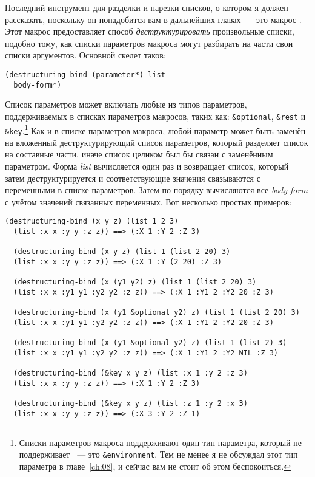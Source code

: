 Последний инструмент для разделки и нарезки списков, о котором я должен рассказать,
поскольку он понадобится вам в дальнейших главах~--- это макрос
. Этот макрос предоставляет способ \textit{деструктурировать}
произвольные списки, подобно тому, как списки параметров макроса могут разбирать на части
свои списки аргументов. Основной скелет  таков:

\begin{lstlisting}
(destructuring-bind (parameter*) list
  body-form*)
\end{lstlisting}

Список параметров может включать любые из типов параметров, поддерживаемых в списках
параметров макросов, таких как: \lstinline!&optional!, \lstinline!&rest! и
\lstinline!&key!.\footnote{Списки параметров макроса поддерживают один тип параметра,
  который не поддерживает ~--- это \lstinline!&environment!. Тем не
  менее я не обсуждал этот тип параметра в главе~\ref{ch:08}, и сейчас вам не стоит об
  этом беспокоиться.} Как и в списке параметров макроса, любой параметр может быть заменён
на вложенный деструктурирующий список параметров, который разделяет список на составные
части, иначе список целиком был бы связан с заменённым параметром. Форма \textit{list}
вычисляется один раз и возвращает список, который затем деструктурируется и
соответствующие значения связываются с переменными в списке параметров. Затем по порядку
вычисляются все \textit{body-form} с учётом значений связанных переменных. Вот несколько
простых примеров:
  
\begin{lstlisting}[style=lisprepl]
  (destructuring-bind (x y z) (list 1 2 3)
  (list :x x :y y :z z)) ==> (:X 1 :Y 2 :Z 3)
  
  (destructuring-bind (x y z) (list 1 (list 2 20) 3)
  (list :x x :y y :z z)) ==> (:X 1 :Y (2 20) :Z 3)
  
  (destructuring-bind (x (y1 y2) z) (list 1 (list 2 20) 3)
  (list :x x :y1 y1 :y2 y2 :z z)) ==> (:X 1 :Y1 2 :Y2 20 :Z 3)
  
  (destructuring-bind (x (y1 &optional y2) z) (list 1 (list 2 20) 3)
  (list :x x :y1 y1 :y2 y2 :z z)) ==> (:X 1 :Y1 2 :Y2 20 :Z 3)
  
  (destructuring-bind (x (y1 &optional y2) z) (list 1 (list 2) 3)
  (list :x x :y1 y1 :y2 y2 :z z)) ==> (:X 1 :Y1 2 :Y2 NIL :Z 3)
  
  (destructuring-bind (&key x y z) (list :x 1 :y 2 :z 3)
  (list :x x :y y :z z)) ==> (:X 1 :Y 2 :Z 3)
  
  (destructuring-bind (&key x y z) (list :z 1 :y 2 :x 3)
  (list :x x :y y :z z)) ==> (:X 3 :Y 2 :Z 1)
\end{lstlisting}

